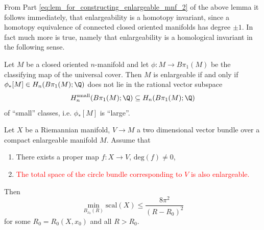 From Part \ref{eq:lem_for_constructing_enlargeable_mnf_2} of the above lemma it follows immediately, that enlargeability is a homotopy invariant, since a homotopy equivalence of connected closed oriented manifolds has degree $\pm 1$. In fact much more is true, namely that enlargeability is a homological invariant in the following sense. 

\begin{theorem*}
    Let $M$ be a closed oriented $n$-manifold and let $\phi \colon M \to B\pi_1(M)$ be the classifying map of the universal cover. Then $M$ is enlargeable if and only if $\phi_\ast [M] \in H_n(B\pi_1(M);\Q)$ does not lie in the rational vector subspace 
    \[
    H_n^\mathrm{small}(B\pi_1(M);\Q) \subseteq H_n(B\pi_1(M);\Q)
    \]
    of ``small'' classes, i.e. $\phi_\ast [M]$ is ``large''.
\end{theorem*}


\begin{gromov}
Let $X$ be a Riemannian manifold, $V \to M$ a two dimensional vector bundle over a compact enlargeable manifold $M$. Assume that 
\begin{enumerate}[label=(\roman*)]
    \item There exists a proper map $f \colon X \to V$, $\mathrm{deg}(f) \neq 0$,
    \item[\textcolor{red}{(ii)}] \textcolor{red}{The total space of the circle bundle corresponding to $V$ is also enlargeable.}
\end{enumerate}
Then 
\[
\min_{B_{x_0}(R)} \mathrm{scal}(X) \leq \frac{8 \pi^2}{(R-R_0)^2}
\]
for some $R_0 = R_0(X,x_0)$ and all $R > R_0$.
\end{gromov}


